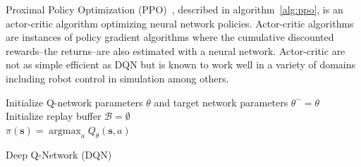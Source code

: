 Proximal Policy Optimization (PPO)~\cite{ppo}, described in algorithm~\ref{alg:ppo}, is an actor-critic algorithm\cite{pg_sutton} optimizing neural network policies. 
Actor-critic algorithms are instances of policy gradient algorithms where the cumulative discounted rewards--the returns--are also estimated with a neural network. 
Actor-critic are not as simple efficient as DQN but is known to work well in a variety of domains including robot control in simulation among others.

\begin{algorithm}
    Initialize Q-network parameters $\theta$ and target network parameters $\theta^- = \theta$ \\
    Initialize replay buffer $\mathcal{B} = \emptyset$ \\
    $\pi(\boldsymbol{s}) = \operatorname{argmax}_a Q_\theta(\boldsymbol{s},a)$ 
    \caption{Deep Q-Network (DQN)}\label{alg:dqn}
\end{algorithm}


